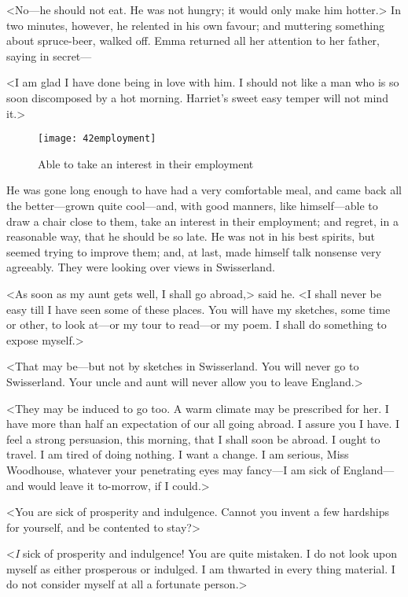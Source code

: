 <No—he should not eat. He was not hungry; it would only make him hotter.> In two minutes, however, he relented in his own favour; and muttering something about spruce-beer, walked off. Emma returned all her attention to her father, saying in secret—

<I am glad I have done being in love with him. I should not like a man who is so soon discomposed by a hot morning. Harriet's sweet easy temper will not mind it.>

\begin{figure}[tbph]
\centering
\texttt{[image: 42employment]}
\caption{Able to take an interest in their employment}
\end{figure}

He was gone long enough to have had a very comfortable meal, and came back all the better—grown quite cool—and, with good manners, like himself—able to draw a chair close to them, take an interest in their employment; and regret, in a reasonable way, that he should be so late. He was not in his best spirits, but seemed trying to improve them; and, at last, made himself talk nonsense very agreeably. They were looking over views in Swisserland.

<As soon as my aunt gets well, I shall go abroad,> said he. <I shall never be easy till I have seen some of these places. You will have my sketches, some time or other, to look at—or my tour to read—or my poem. I shall do something to expose myself.>

<That may be—but not by sketches in Swisserland. You will never go to Swisserland. Your uncle and aunt will never allow you to leave England.>

<They may be induced to go too. A warm climate may be prescribed for her. I have more than half an expectation of our all going abroad. I assure you I have. I feel a strong persuasion, this morning, that I shall soon be abroad. I ought to travel. I am tired of doing nothing. I want a change. I am serious, Miss Woodhouse, whatever your penetrating eyes may fancy—I am sick of England—and would leave it to-morrow, if I could.>

<You are sick of prosperity and indulgence. Cannot you invent a few hardships for yourself, and be contented to stay?>

<\textit{I} sick of prosperity and indulgence! You are quite mistaken. I do not look upon myself as either prosperous or indulged. I am thwarted in every thing material. I do not consider myself at all a fortunate person.>

